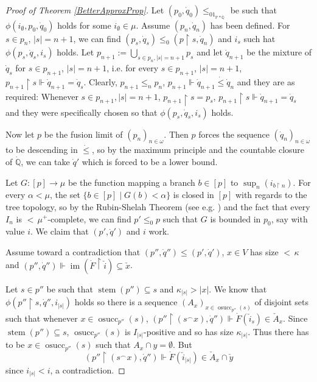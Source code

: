 \documentclass[a4paper]{amsart}
\theoremstyle{definition}
\theoremstyle{remark}
\theoremstyle{plain}
\numberwithin{mydef}{section}
\DeclareMathOperator{\im}{im}
\DeclareMathOperator{\stem}{stem}
\DeclareMathOperator{\osucc}{osucc}
\newcommand{\dP}{\mathbb{P}}
\newcommand{\dQ}{\mathbb{Q}}
\newcommand{\uhr}{\upharpoonright}
\begin{document}
\begin{proof}[Proof of Theorem \ref{BetterApproxProp}]
		Let $(p_0,\dot{q}_0)\leq_01_{\dP*\dot{\dQ}}$ be such that $\phi(i_{\emptyset},p_0,\dot{q}_0)$ holds for some $i_{\emptyset}\in\mu$. Assume $(p_n,\dot{q}_n)$ has been defined. For $s\in p_n$, $|s|=n+1$, we can find $(p_s,\dot{q}_s)\leq_0(p\uhr s,\dot{q}_n)$ and $i_s$ such hat $\phi(p_s,\dot{q}_s,i_s)$ holds. Let $p_{n+1}:=\bigcup_{s\in p_n,|s|=n+1}p_s$ and let $\dot{q}_{n+1}$ be the mixture of $\dot{q}_s$ for $s\in p_{n+1}$, $|s|=n+1$, i.e. for every $s\in p_{n+1}$, $|s|=n+1$, $p_{n+1}\uhr s\Vdash\dot{q}_{n+1}=\dot{q}_s$. Clearly, $p_{n+1}\leq_np_n$, $p_{n+1}\Vdash\dot{q}_{n+1}\dot{\leq}\dot{q}_n$ and they are as required: Whenever $s\in p_{n+1},|s|=n+1$, $p_{n+1}\uhr s=p_s$, $p_{n+1}\uhr s\Vdash\dot{q}_{n+1}=\dot{q}_s$ and they were specifically chosen so that $\phi(p_s,\dot{q}_s,i_s)$ holds.
		
		Now let $p$ be the fusion limit of $(p_n)_{n\in\omega}$. Then $p$ forces the sequence $(\dot{q}_n)_{n\in\omega}$ to be descending in $\dot{\leq}$, so by the maximum principle and the countable closure of $\dot{\dQ}$, we can take $\dot{q}'$ which is forced to be a lower bound.
		
		Let $G\colon[p]\to\mu$ be the function mapping a branch $b\in[p]$ to $\sup_n(i_{b\uhr n})$. For every $\alpha<\mu$, the set $\{b\in[p]\;|\;G(b)<\alpha\}$ is closed in $[p]$ with regards to the tree topology, so by the Rubin-Shelah Theorem (see e.g. \cite[Chapter XI, Lemma 3.5 (1)]{ShelahProperImproper}) and the fact that every $I_n$ is ${<}\,\mu^+$-complete, we can find $p'\leq_0p$ such that $G$ is bounded in $p_0$, say with value $i$. We claim that $(p',\dot{q}')$ and $i$ work.
		
		Assume toward a contradiction that $(p'',\dot{q}'')\leq(p',\dot{q}')$, $x\in V$ has size ${<}\,\kappa$ and $(p'',\dot{q}'')\Vdash\im(\dot{F}\uhr\check{i})\subseteq\check{x}$.
		
		Let $s\in p''$ be such that $\stem(p'')\subseteq s$ and $\kappa_{|s|}>|x|$. We know that $\phi(p''\uhr s,\dot{q}'',i_{|s|})$ holds so there is a sequence $(A_x)_{x\in\osucc_{p''}(s)}$ of disjoint sets such that whenever $x\in\osucc_{p''}(s)$, $(p''\uhr(s^{\frown}x),\dot{q}'')\Vdash\dot{F}(\check{i}_s)\in\check{A}_x$. Since $\stem(p'')\subseteq s$, $\osucc_{p''}(s)$ is $I_{|s|}$-positive and so has size $\kappa_{|s|}$. Thus there has to be $x\in\osucc_{p''}(s)$ such that $A_x\cap y=\emptyset$. But
		$$(p''\uhr(s^{\frown}x),\dot{q}'')\Vdash\dot{F}(\check{i}_{|s|})\in\check{A}_x\cap\check{y}$$
		since $i_{|s|}<i$, a contradiction.
	\end{proof}
	
\end{document}
